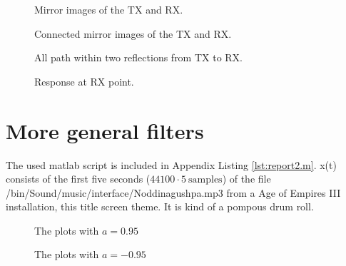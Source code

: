 \documentclass[final]{scrreprt} %
\begin{document}
\begin{figure}[H]
	\centering
	\setlength\figureheight{6cm}
    	\setlength\figurewidth{6cm}
	
	\caption{Mirror images of the TX and RX.}
	\label{fig:mirror}
\end{figure}

\begin{figure}[H]
	\centering
	\setlength\figureheight{6cm}
    	\setlength\figurewidth{6cm}
	
	\caption{Connected mirror images of the TX and RX.}
	\label{fig:connected}
\end{figure}

\begin{figure}[H]
	\centering
	\setlength\figureheight{6cm}
    	\setlength\figurewidth{6cm}
	
	\caption{All path within two reflections from TX to RX.}
	\label{fig:reflections}
\end{figure}

\begin{figure}[H]
	\centering
	\setlength\figureheight{4cm}
    	\setlength{}
	
	\caption{Response at RX point.}
	\label{fig:response}
\end{figure}

\section{More general filters}
The used matlab script is included in Appendix Listing \ref{lst:report2.m}.
x(t) consists of the first five seconds ($44100\cdot5 ~\mathrm{samples}$) of the file /bin/Sound/music/interface/Noddinagushpa.mp3 from a Age of Empires III installation, this title screen theme.
It is kind of a pompous drum roll.
\begin{figure}[H]
	\centering
    	\setlength\figureheight{3.5cm}
    	\setlength{}
    	    	
    	\caption{The plots with $a=0.95$}
    	\label{fig:a0.95-plots}
\end{figure}
\begin{figure}[H]
	\centering
    	\setlength\figureheight{3.5cm}
    	\setlength{}
    	    	
    	\caption{The plots with $a=-0.95$}
    	\label{fig:a0.-95-plots}
\end{figure}
\end{document}
